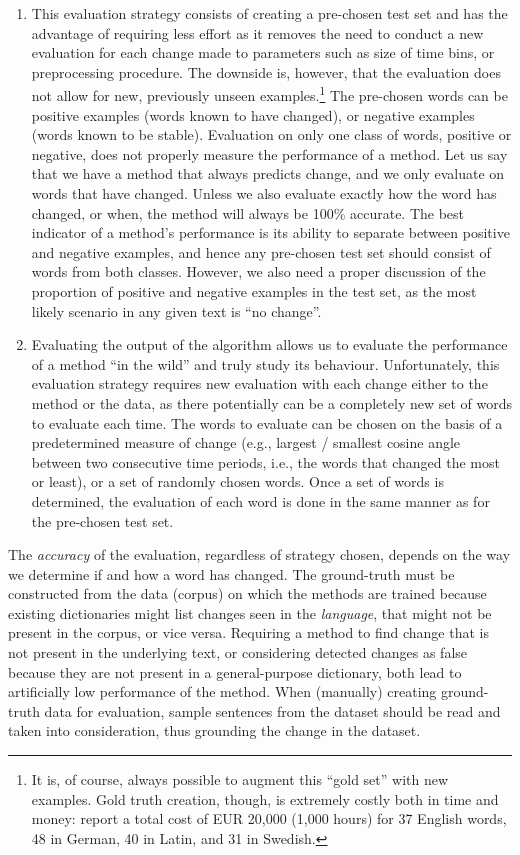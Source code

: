 \documentclass[output=paper]{langscibook}
\begin{document}
\begin{enumerate}[label=(\roman*)]
\item This evaluation strategy consists of creating a pre-chosen test set and has the advantage of requiring less effort as it removes the need to conduct a new evaluation for each change made to parameters such as size of time bins, or preprocessing procedure. The downside is, however, that the evaluation does not allow for new, previously unseen examples.\footnote{It is, of course, always possible to augment this ``gold set'' with new examples. Gold truth creation, though, is extremely costly both in time and money: \citet{schlechtweg-etal-2020-semeval} report a total cost of EUR 20,000 (1,000 hours) for 37 English words, 48 in German, 40 in Latin, and 31 in Swedish.} 
The pre-chosen words can be positive examples (words known to have changed), or negative examples (words known to be stable). Evaluation on only one class of words, positive or negative, does not properly measure the performance of a method. Let us say that we have a method that always predicts change, and we only evaluate on words that have changed. Unless we also evaluate exactly how the word has changed, or when, the method will always be 100\% accurate. The best indicator of a method's performance is its ability to separate between positive and negative examples, and hence any pre-chosen test set should consist of words from both classes. However, we also need a proper discussion of the proportion of positive and negative examples in the test set, as the most likely scenario in any given text is ``no change''. 
	
\item Evaluating the output of the algorithm allows us to evaluate the performance of a method ``in the wild'' and truly study its behaviour. Unfortunately, this evaluation strategy requires new evaluation with each change either to the method or the data, as there potentially can be a completely new set of words to evaluate each time. 
The words to evaluate can be chosen on the basis of a predetermined measure of change (e.g., largest / smallest cosine angle between two consecutive time periods, i.e., the words that changed the most or least), or a set of randomly chosen words. Once a set of words is determined, the evaluation of each word is done in the same manner as for the pre-chosen test set. 
\end{enumerate}
	
The \textit{accuracy} of the evaluation, regardless of strategy chosen, depends on the way we determine if and how a word has changed. The ground-truth must be constructed from the data (corpus) on which the methods are trained because existing dictionaries might list changes seen in the \emph{language}, that might not be present in the corpus, or vice versa. Requiring a method to find change that is not present in the underlying text, or considering detected changes as false because they are not present in a general-purpose dictionary, both lead to artificially low performance of the method. When (manually) creating ground-truth data for evaluation, sample sentences from the dataset should be read and taken into consideration, thus grounding the change in the dataset. 
\end{document}
